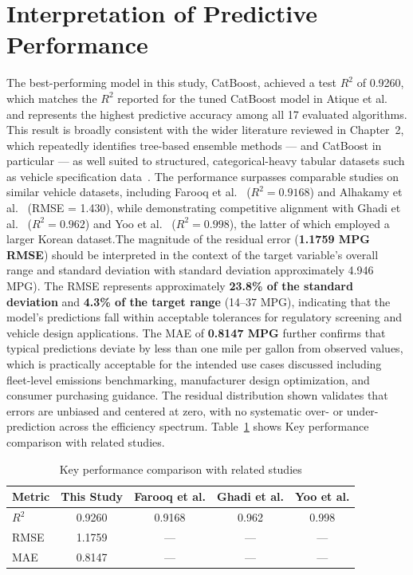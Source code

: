 \section{Interpretation of Predictive Performance}

The best-performing model in this study, CatBoost, achieved a test $R^2$ of 0.9260, which matches the $R^2$ reported for the tuned CatBoost model in Atique et al.~\cite{atique2026explainable} and represents the highest predictive accuracy among all 17 evaluated algorithms. This result is broadly consistent with the wider literature reviewed in Chapter~2, which repeatedly identifies tree-based ensemble methods --- and CatBoost in particular --- as well suited to structured, categorical-heavy tabular datasets such as vehicle specification data~\cite{atique2026explainable}\cite{grinsztajn2022tree}. The performance surpasses comparable studies on similar vehicle datasets, including Farooq et al.~\cite{farooq2025interpretable} ($R^2 = 0.9168$) and Alhakamy et al.~\cite{alhakamy2023used} (RMSE = 1.430), while demonstrating competitive alignment with Ghadi et al.~\cite{ghadi2025explainable} ($R^2 = 0.962$) and Yoo et al.~\cite{yoo2025machine} ($R^2 = 0.998$), the latter of which employed a larger Korean dataset.The magnitude of the residual error (\textbf{1.1759 MPG RMSE}) should be interpreted in the context of the target variable's overall range and standard deviation with standard deviation approximately 4.946 MPG). The RMSE represents approximately \textbf{23.8\% of the standard deviation} and \textbf{4.3\% of the target range} (14--37 MPG), indicating that the model's predictions fall within acceptable tolerances for regulatory screening and vehicle design applications. The MAE of \textbf{0.8147 MPG} further confirms that typical predictions deviate by less than one mile per gallon from observed values, which is practically acceptable for the intended use cases discussed including fleet-level emissions benchmarking, manufacturer design optimization, and consumer purchasing guidance. The residual distribution shown validates that errors are unbiased and centered at zero, with no systematic over- or under-prediction across the efficiency spectrum. Table~\ref{tab:comparison}\cite{atique2026explainable} shows Key performance comparison with related studies.

\begin{table}[H]
\centering
\setlength{\arrayrulewidth}{1.8pt}
\renewcommand{\arraystretch}{1.2}

\begin{tabular}{|l|c|c|c|c|}
\hline
\textbf{Metric} &
\textbf{This Study} &
\textbf{Farooq et al.}\cite{farooq2025interpretable} &
\textbf{Ghadi et al.}\cite{ghadi2025explainable} &
\textbf{Yoo et al.}\cite{yoo2025machine} \\
\hline
$R^2$ & 0.9260 & 0.9168 & 0.962 & 0.998 \\
\hline
RMSE & 1.1759 & --- & --- & --- \\
\hline
MAE & 0.8147 & --- & --- & --- \\
\hline
\end{tabular}

\caption{Key performance comparison with related studies}
\label{tab:comparison}
\end{table}

